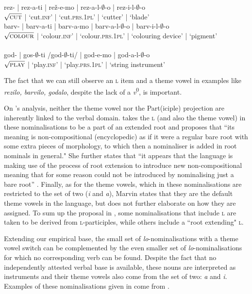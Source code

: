 \documentclass[output=paper,colorlinks,citecolor=brown]{langscibook}
\begin{document}
\ea \label{ex: čudala}
\ea
\gll rez- | rez-a-ti |  rež-e-mo | rez-a-l-$\emptyset$-o | rez-i-l-$\emptyset$-o\\
$\sqrt{\textsc{cut}}$ | `cut.\textsc{inf}' | `cut.\textsc{prs.1pl}' | `cutter' | `blade' \\
\ex \label{ex:barv}
\gll barv- | barv-a-ti | barv-a-mo | barv-a-l-$\emptyset$-o | barv-i-l-$\emptyset$-o\\
$\sqrt{\textsc{colour}}$ | `colour.\textsc{inf}' | `colour.\textsc{prs.1pl}' | `colouring{ }device' | `pigment' \\
\\
\ex \label{ex:god-e-mo}
\gll god- | gos-$\emptyset$-ti{ }/god-$\emptyset$-ti/ | god-e-mo | god-a-l-$\emptyset$-o\\
$\sqrt{\textsc{play}}$ | `play.\textsc{inf}' | `play.\textsc{prs.1pl}' | `string{ }instrument' \\

\z 
\z 

\noindent The fact that we can still observe an \textsc{l} item  and a theme vowel in examples like \textit{rezilo, barvilo, godalo}, despite the lack of a \textit{v}\textsuperscript{0}, is important.

On \citeauthor{marvin2002}'s analysis, neither the theme vowel nor the Part(iciple) projection are inherently linked to the verbal domain. \citet[110]{marvin2002} takes the \textsc{l} (and also the theme vowel) in these nominalisations to be a part of an  extended root and proposes that ``its meaning is non-compositional (encyclopedic) as if it were a regular bare root with some extra pieces of morphology, to which then a nominaliser is added in root nominals in general." She further states that ``it appears that the language is making use of the process of root extension to introduce new non-compositional meaning that for some reason could not be introduced by nominalising just a bare root” \citep[110, 111]{marvin2002}. Finally, as for the theme vowels, which in these nominalisations are restricted to the set of two (\textit{i} and \textit{a}), Marvin states that they are the default theme vowels in the language, but does not further elaborate on how they are assigned. To sum up the proposal in \citet{marvin2002}, some nominalisations that include \textsc{l} are taken to be derived from \textsc{l}-participles, while others include a ``root extending" \textsc{l}.

Extending our empirical base, the small set of \textit{lo}-nominalisations with a theme vowel switch can be complemented by the even smaller set of \textit{lo}-nominalisations for which no corresponding verb can be found. Despite the fact that no independently attested verbal base is available, these nouns are interpreted as instruments and their theme vowels also come from the set of two: \textit{a} and \textit{i}. Examples of these nominalisations given in  come from \citet{Simonovic2020}.
 
\end{document}
